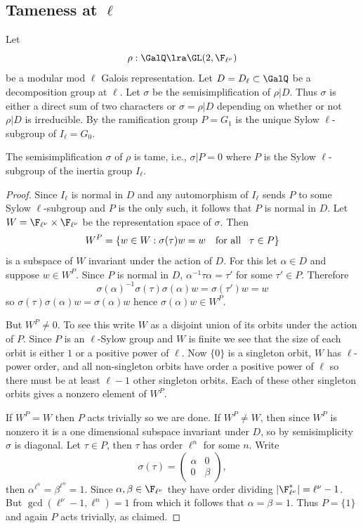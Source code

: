 \documentclass{report}
\begin{document}
\subsection{Tameness at $\ell$}
Let
      $$\rho:\GalQ \lra \GL(2,\F_{\ell^\nu})$$
be a modular mod $\ell$ Galois representation.
Let $D = D_{\ell}\subset\GalQ$ be a decomposition group at $\ell$.
Let $\sigma$ be the semisimplification of $\rho|D$.
Thus $\sigma$ is either a direct sum of two
characters or $\sigma=\rho|D$ depending on whether
or not $\rho|D$ is irreducible.
By \cite[8.1]{frohlich:local} the ramification
group $P=G_1$ is the unique Sylow $\ell$-subgroup
of $I_{\ell} = G_0$.
\begin{lemma} The semisimplification $\sigma$ of $\rho$ is tame, i.e.,
$\sigma|P = 0$
where $P$ is the Sylow $\ell$-subgroup of the inertia
group $I_{\ell}$.
\end{lemma}
\begin{proof}
Since $I_{\ell}$ is normal in $D$ and any automorphism of $I_{\ell}$
sends $P$ to some Sylow $\ell$-subgroup and $P$ is the only such,
it follows that $P$ is normal in $D$.
Let $W=\F_{\ell^{\nu}}\times\F_{\ell^{\nu}}$ be the representation
space of $\sigma$. Then
$$W^P=\{w\in W : \sigma(\tau)w = w \quad\mbox{\rm for all}
                                   \quad\! \tau\in P\}$$
is a subspace of $W$ invariant under the action of $D$.
For this let $\alpha\in D$ and suppose $w\in W^P$. Since $P$
is normal in $D$, $\alpha^{-1}\tau\alpha=\tau'$ for some $\tau'\in P$.
Therefore
$$\sigma(\alpha)^{-1}\sigma(\tau)\sigma(\alpha)w = \sigma(\tau') w = w$$
so $\sigma(\tau)\sigma(\alpha)w = \sigma(\alpha)w$ hence
$\sigma(\alpha)w\in W^P$.

But $W^P\neq 0$. To see this write $W$ as a disjoint union of its orbits
under the action of $P$. Since $P$ is an $\ell$-Sylow group and $W$ is
finite we see that the size of each orbit is either $1$ or a positive
power of $\ell$. Now $\{0\}$ is a singleton orbit, $W$ has $\ell$-power
order, and all non-singleton orbits have order a positive power of $\ell$
so there must be at least $\ell-1$ other singleton orbits.
Each of these other singleton
orbits gives a nonzero element of $W^P$.

If $W^P=W$ then $P$ acts trivially so we are done. If
$W^P\neq W$, then since $W^P$ is nonzero it
is a one dimensional subspace invariant under $D$, so
by semisimplicity $\sigma$ is diagonal.
Let $\tau\in P$,
then $\tau$ has order $\ell^n$ for some $n$. Write
$$\sigma(\tau)=\left(\begin{array}{cc}\alpha&0\\0&\beta\end{array}\right),$$
then $\alpha^{\ell^n}=\beta^{\ell^n}=1$. Since
$\alpha, \beta\in\F_{\ell^{\nu}}$ they have order
dividing $|\F_{\ell^{\nu}}^*| = \ell^{\nu}-1$.
But $\gcd(\ell^{\nu}-1,\ell^n)=1$ from which it
follows that $\alpha=\beta=1$.  Thus $P=\{1\}$ and again
$P$ acts trivially, as claimed.
\end{proof}
\end{document}
